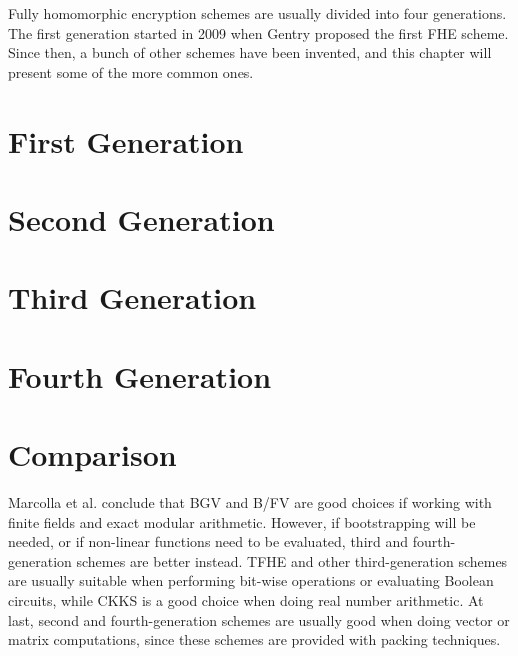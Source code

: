 Fully homomorphic encryption schemes are usually divided into four generations. The first generation started in 2009 when Gentry \cite{cite:gentry1} proposed the first FHE scheme. Since then, a bunch of other schemes have been invented, and this chapter will present some of the more common ones.

\section{First Generation}


\section{Second Generation}


\section{Third Generation}


\section{Fourth Generation}



\section{Comparison}
Marcolla et al. \cite{cite:QianFHE} conclude that BGV and B/FV are good choices if working with finite fields and exact modular arithmetic. However, if bootstrapping will be needed, or if non-linear functions need to be evaluated, third and fourth-generation schemes are better instead. TFHE and other third-generation schemes are usually suitable when performing bit-wise operations or evaluating Boolean circuits, while CKKS is a good choice when doing real number arithmetic. At last, second and fourth-generation schemes are usually good when doing vector or matrix computations, since these schemes are provided with packing techniques. %

